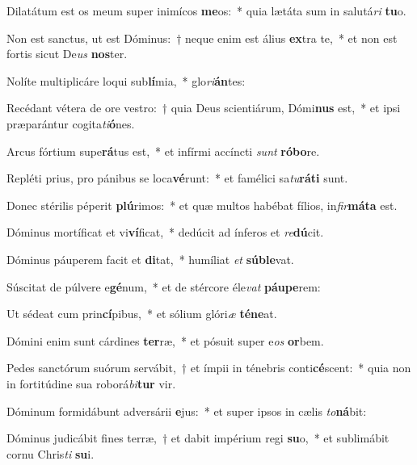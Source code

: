 \item Dilatátum est os meum super inimícos \textbf{me}os:~* quia lætáta sum in salutá\textit{ri} \textbf{tu}o.
\item Non est sanctus, ut est Dóminus:~† neque enim est álius \textbf{ex}tra te,~* et non est fortis sicut De\textit{us} \textbf{nos}ter.
\item Nolíte multiplicáre loqui sub\textbf{lí}mia,~* glo\textit{ri}\textbf{án}tes:
\item Recédant vétera de ore vestro:~† quia Deus scientiárum, Dómi\textbf{nus} est,~* et ipsi præparántur cogita\textit{ti}\textbf{ó}nes.
\item Arcus fórtium supe\textbf{rá}tus est,~* et infírmi accíncti \textit{sunt} \textbf{ró}\textbf{bo}re.
\item Repléti prius, pro pánibus se loca\textbf{vé}runt:~* et famélici sa\textit{tu}\textbf{rá}\textbf{ti} sunt.
\item Donec stérilis péperit \textbf{plú}rimos:~* et quæ multos habébat fílios, in\textit{fir}\textbf{má}\textbf{ta} est.
\item Dóminus mortíficat et vi\textbf{ví}ficat,~* dedúcit ad ínferos et \textit{re}\textbf{dú}cit.
\item Dóminus páuperem facit et \textbf{di}tat,~* humíliat \textit{et} \textbf{súb}\textbf{le}vat.
\item Súscitat de púlvere e\textbf{gé}num,~* et de stércore éle\textit{vat} \textbf{páu}\textbf{pe}rem:
\item Ut sédeat cum prin\textbf{cí}pibus,~* et sólium glóri\textit{æ} \textbf{té}\textbf{ne}at.
\item Dómini enim sunt cárdines \textbf{ter}ræ,~* et pósuit super e\textit{os} \textbf{or}bem.
\item Pedes sanctórum suórum servábit,~† et ímpii in ténebris conti\textbf{cé}scent:~* quia non in fortitúdine sua roborá\textit{bi}\textbf{tur} vir.
\item Dóminum formidábunt adversárii \textbf{e}jus:~* et super ipsos in cælis \textit{to}\textbf{ná}bit:
\item Dóminus judicábit fines terræ,~† et dabit impérium regi \textbf{su}o,~* et sublimábit cornu Chris\textit{ti} \textbf{su}i.
